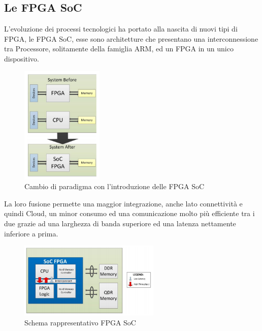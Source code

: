 \subsection{Le FPGA SoC}
L'evoluzione dei processi tecnologici ha portato alla nascita di nuovi tipi di FPGA, le FPGA SoC, esse sono architetture che presentano una interconnessione tra Processore, solitamente della famiglia ARM, ed un FPGA in un unico dispositivo.
\begin{figure}[h]
\centering
\includegraphics[width=0.35\textwidth]{images/Capture1.png}
\caption{Cambio di paradigma con l'introduzione delle FPGA SoC}
\end{figure}\clearpage
La loro fusione permette una maggior integrazione, anche lato connettività e quindi Cloud, un minor consumo ed una comunicazione molto più efficiente tra i due grazie ad una larghezza di banda superiore ed una latenza nettamente inferiore a prima.
\begin{figure}[h]
\centering
\includegraphics[width=0.6\textwidth]{images/Capture8.png}
\caption{Schema rappresentativo FPGA SoC}
\end{figure}
